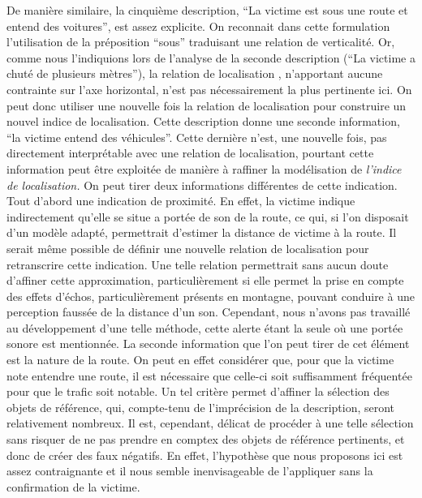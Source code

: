 De manière similaire, la cinquième description, \enquote{La victime
  est sous une route et entend des voitures}, est assez explicite. On
reconnait dans cette formulation l'utilisation de la préposition
\enquote{sous} traduisant une relation de verticalité. Or, comme nous
l'indiquions lors de l'analyse de la seconde description (\enquote{La
  victime a chuté de plusieurs mètres}), la relation de localisation
, n'apportant aucune contrainte sur l'axe
horizontal, n'est pas nécessairement la plus pertinente ici. On peut
donc utiliser une nouvelle fois la relation de localisation
 pour construire un nouvel indice de
localisation. Cette description donne une seconde information,
\enquote{la victime entend des véhicules}. Cette dernière n'est, une
nouvelle fois, pas directement interprétable avec une relation de
localisation, pourtant cette information peut être exploitée de
manière à raffiner la modélisation de \emph{l'indice de localisation.}
On peut tirer deux informations différentes de cette indication. Tout
d'abord une indication de proximité. En effet, la victime indique
indirectement qu'elle se situe a portée de son de la route, ce qui, si
l'on disposait d'un modèle adapté, permettrait d'estimer la distance
de victime à la route. Il serait même possible de définir une nouvelle
relation de localisation  pour
retranscrire cette indication. Une telle relation permettrait sans
aucun doute d'affiner cette approximation, particulièrement si elle
permet la prise en compte des effets d’échos, particulièrement
présents en montagne, pouvant conduire à une perception faussée de la
distance d'un son. Cependant, nous n'avons pas travaillé au
développement d'une telle méthode, cette alerte étant la seule où une
portée sonore est mentionnée. La seconde information que l'on peut
tirer de cet élément est la nature de la route. On peut en effet
considérer que, pour que la victime note entendre une route, il est
nécessaire que celle-ci soit suffisamment fréquentée pour que le
trafic soit notable. Un tel critère permet d'affiner la sélection des
objets de référence, qui, compte-tenu de l’imprécision de la
description, seront relativement nombreux. Il est, cependant, délicat
de procéder à une telle sélection sans risquer de ne pas prendre en
comptex des objets de référence pertinents, et donc de créer des faux
négatifs. En effet, l'hypothèse que nous proposons ici est assez
contraignante et il nous semble inenvisageable de l'appliquer sans la
confirmation de la victime.

